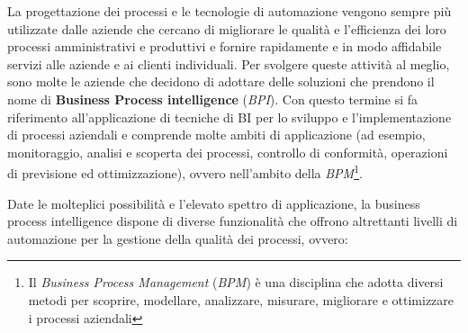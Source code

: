 La progettazione dei processi e le tecnologie di automazione vengono sempre più utilizzate dalle aziende che cercano di migliorare le qualità e l'efficienza dei loro processi amministrativi e produttivi e fornire rapidamente e in modo affidabile servizi alle aziende e ai clienti individuali. Per svolgere queste attività al meglio, sono molte le aziende che decidono di adottare delle soluzioni che prendono il nome di \textbf{Business Process intelligence} (\textit{BPI}). Con questo termine si fa riferimento all'applicazione di tecniche di BI per lo sviluppo e l'implementazione di processi aziendali e comprende molte ambiti di applicazione (ad esempio, monitoraggio, analisi e scoperta dei processi, controllo di conformità, operazioni di previsione ed ottimizzazione), ovvero nell'ambito della \textit{BPM}\footnote{Il \textit{Business Process Management} (\textit{BPM}) è una disciplina che adotta diversi metodi per scoprire, modellare, analizzare, misurare, migliorare e ottimizzare i processi aziendali\cite{gartner_bpm}}.\cite{academiaedu_bpi_definition}

Date le molteplici possibilità e l'elevato spettro di applicazione, la business process intelligence dispone di diverse funzionalità che offrono altrettanti livelli di automazione per la gestione della qualità dei processi, ovvero:\cite{academiaedu_bpi_feautures}

